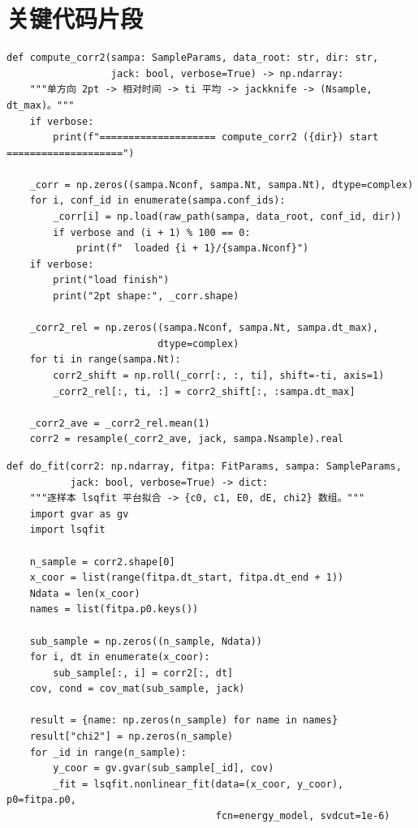 \documentclass[UTF8]{ctexart}
\begin{document}
\section{关键代码片段}
\begin{lstlisting}[firstline=145,lastline=176]
def compute_corr2(sampa: SampleParams, data_root: str, dir: str,
                  jack: bool, verbose=True) -> np.ndarray:
    """单方向 2pt -> 相对时间 -> ti 平均 -> jackknife -> (Nsample, dt_max)。"""
    if verbose:
        print(f"==================== compute_corr2 ({dir}) start ====================")

    _corr = np.zeros((sampa.Nconf, sampa.Nt, sampa.Nt), dtype=complex)
    for i, conf_id in enumerate(sampa.conf_ids):
        _corr[i] = np.load(raw_path(sampa, data_root, conf_id, dir))
        if verbose and (i + 1) % 100 == 0:
            print(f"  loaded {i + 1}/{sampa.Nconf}")
    if verbose:
        print("load finish")
        print("2pt shape:", _corr.shape)

    _corr2_rel = np.zeros((sampa.Nconf, sampa.Nt, sampa.dt_max),
                          dtype=complex)
    for ti in range(sampa.Nt):
        corr2_shift = np.roll(_corr[:, :, ti], shift=-ti, axis=1)
        _corr2_rel[:, ti, :] = corr2_shift[:, :sampa.dt_max]

    _corr2_ave = _corr2_rel.mean(1)
    corr2 = resample(_corr2_ave, jack, sampa.Nsample).real
\end{lstlisting}

\begin{lstlisting}[firstline=200,lastline=224]
def do_fit(corr2: np.ndarray, fitpa: FitParams, sampa: SampleParams,
           jack: bool, verbose=True) -> dict:
    """逐样本 lsqfit 平台拟合 -> {c0, c1, E0, dE, chi2} 数组。"""
    import gvar as gv
    import lsqfit

    n_sample = corr2.shape[0]
    x_coor = list(range(fitpa.dt_start, fitpa.dt_end + 1))
    Ndata = len(x_coor)
    names = list(fitpa.p0.keys())

    sub_sample = np.zeros((n_sample, Ndata))
    for i, dt in enumerate(x_coor):
        sub_sample[:, i] = corr2[:, dt]
    cov, cond = cov_mat(sub_sample, jack)

    result = {name: np.zeros(n_sample) for name in names}
    result["chi2"] = np.zeros(n_sample)
    for _id in range(n_sample):
        y_coor = gv.gvar(sub_sample[_id], cov)
        _fit = lsqfit.nonlinear_fit(data=(x_coor, y_coor), p0=fitpa.p0,
                                    fcn=energy_model, svdcut=1e-6)
\end{lstlisting}
\end{document}
